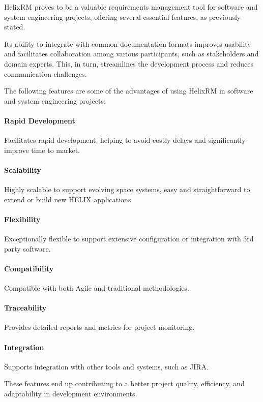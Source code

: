 HelixRM proves to be a valuable requirements management tool for software
and system engineering projects, offering several essential features, as
previously stated.

Its ability to integrate with common documentation formats improves
usability and facilitates collaboration among various participants,
such as stakeholders and domain experts.
This, in turn, streamlines the development process and reduces communication challenges\cite{michele_zamparelli_2006}.


The following features are some of the advantages of using HelixRM in software and system engineering projects:

\paragraph{Rapid Development}
Facilitates rapid development, helping to avoid costly delays and significantly improve time to market\footnotemark[1].

\paragraph{Scalability}
Highly scalable to support evolving space systems, easy and straightforward to extend or build new HELIX applications\footnotemark[1].

\paragraph{Flexibility}
Exceptionally flexible to support extensive configuration or integration with 3rd party software\footnotemark[1].

\paragraph{Compatibility}
Compatible with both Agile and traditional methodologies\footnotemark[2].

\paragraph{Traceability}
Provides detailed reports and metrics for project monitoring\footnotemark[2].

\paragraph{Integration}
Supports integration with other tools and systems, such as JIRA\footnotemark[2].

These features end up contributing to a better project quality,
efficiency, and adaptability in development environments\cite{youngki_hong__2010}.


~





